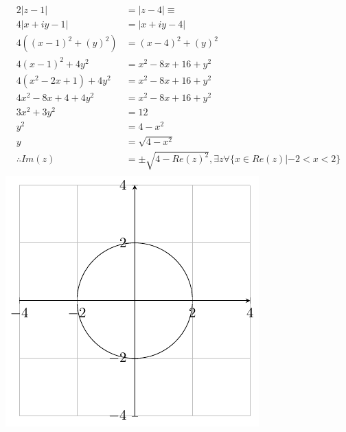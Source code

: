 \documentclass{myassignment}
\begin{document}
	\begin{answer}
		\begin{multicols}{2}
			\begin{align*}
				2|z-1| &= |z-4| \equiv \\[2em]
				4|x+iy-1| &= |x+iy-4|\\[1em]
				4((x-1)^2+(y)^2) &= (x-4)^2+(y)^2 \\[1em]
				4(x-1)^2+4y^2 &= x^2-8x+16+y^2 \\[1em]
				4(x^2-2x+1)+4y^2 &= x^2-8x+16+y^2 \\[1em]
				4x^2-8x+4 + 4y^2 &= x^2-8x+16+y^2 \\[1em]
				3x^2 + 3y^2 &= 12 \\[1em]
				y^2 &= 4 - x^2 \\[1em]
				y &= \sqrt{4 - x^2}\\[1em]
				\therefore Im(z) &= \pm\sqrt{4 - Re(z)^2}, \exists z \forall \{x \in Re(z) | -2 < x <2 \} \\[1em]
			\end{align*}
		\columnbreak
		\includegraphics{graphact4}

		\end{multicols}
	\end{answer}
\end{document}
